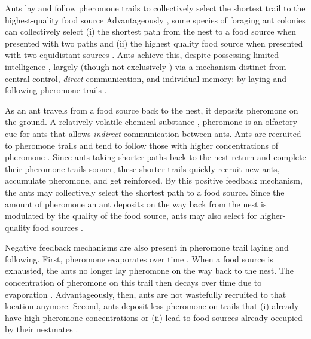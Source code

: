 \documentclass[11pt, oneside]{article}
\begin{document}
\begin{mybox}[label=box:ants, breakable]{Ants lay and follow pheromone trails to collectively select the shortest trail to the highest-quality food source}
Advantageously \cite{deneubourg1983probabilistic}, some species of foraging ant colonies can collectively select 
(i) the shortest path from the nest to a food source when presented with two paths \cite{goss1989self}
and
(ii) the highest quality food source when presented with two equidistant sources \cite{beckers1993modulation}. 
Ants achieve this, despite possessing limited intelligence  \cite{edelstein1995trail}, largely (though not exclusively \cite{evison2008combined,czaczkes2015trail,robinson2005no}) via a mechanism distinct from central control, \emph{direct} communication, and individual memory: by laying and following pheromone trails \cite{czaczkes2015trail}. 

As an ant travels from a food source back to the nest, it deposits pheromone on the ground. A relatively volatile chemical substance \cite{david2009trail}, pheromone is an olfactory cue for ants \cite{knaden2016sensory} that allows \emph{indirect} communication between ants. 
Ants are recruited to pheromone trails and tend to follow those with higher concentrations of pheromone \cite{beckers1993modulation,czaczkes2015trail}. 
Since ants taking shorter paths back to the nest return and complete their pheromone trails sooner, these shorter trails quickly recruit new ants, accumulate pheromone, and get reinforced. By this positive feedback mechanism, the ants may collectively select the shortest path to a food source. \cite{jackson2006communication,czaczkes2015trail,bonabeau1999swarm}
Since the amount of pheromone an ant deposits on the way back from the nest is modulated by the quality of the food source, ants may also select for higher-quality food sources \cite{beckers1993modulation}.

Negative feedback mechanisms are also present in pheromone trail laying and following.
First, pheromone evaporates over time \cite{jackson2006communication}.
When a food source is exhausted, the ants no longer lay pheromone on the way back to the nest. 
The concentration of pheromone on this trail then decays over time due to evaporation \cite{david2009trail,van2011temperature}. Advantageously, then, ants are not wastefully recruited to that location anymore. 
Second, ants deposit less pheromone on trails that (i) already have high pheromone concentrations \cite{czaczkes2013ant} or (ii) lead to food sources already occupied by their nestmates \cite{wendt2020negative}.


\end{mybox}
\end{document}
